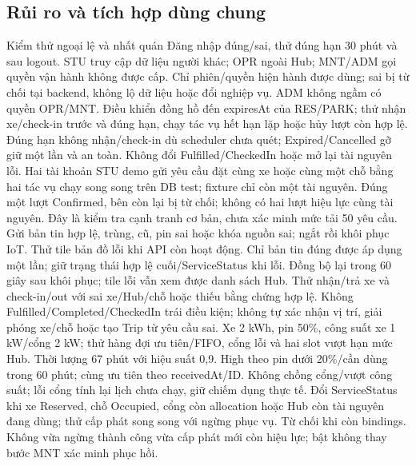 \subsection{Rủi ro và tích hợp dùng chung}
\begin{SystemTestCases}{Kiểm thử ngoại lệ và nhất quán}
{Đăng nhập đúng/sai, thử đúng hạn 30 phút và sau logout. STU truy cập dữ liệu người khác; OPR ngoài Hub; MNT/ADM gọi quyền vận hành không được cấp.}
{Chỉ phiên/quyền hiện hành được dùng; sai bị từ chối tại backend, không lộ dữ liệu hoặc đổi nghiệp vụ. ADM không ngầm có quyền OPR/MNT.}
{Điều khiển đồng hồ đến expiresAt của RES/PARK; thử nhận xe/check-in trước và đúng hạn, chạy tác vụ hết hạn lặp hoặc hủy lượt còn hợp lệ.}
{Đúng hạn không nhận/check-in dù scheduler chưa quét; Expired/Cancelled gỡ giữ một lần và an toàn. Không đổi Fulfilled/CheckedIn hoặc mở lại tài nguyên lỗi.}
{Hai tài khoản STU demo gửi yêu cầu đặt cùng xe hoặc cùng một chỗ bằng hai tác vụ chạy song song trên DB test; fixture chỉ còn một tài nguyên.}
{Đúng một lượt Confirmed, bên còn lại bị từ chối; không có hai lượt hiệu lực cùng tài nguyên. Đây là kiểm tra cạnh tranh cơ bản, chưa xác minh mức tải 50 yêu cầu.}
{Gửi bản tin hợp lệ, trùng, cũ, pin sai hoặc khóa nguồn sai; ngắt rồi khôi phục IoT. Thử tile bản đồ lỗi khi API còn hoạt động.}
{Chỉ bản tin đúng được áp dụng một lần; giữ trạng thái hợp lệ cuối/ServiceStatus khi lỗi. Đồng bộ lại trong 60 giây sau khôi phục; tile lỗi vẫn xem được danh sách Hub.}
{Thử nhận/trả xe và check-in/out với sai xe/Hub/chỗ hoặc thiếu bằng chứng hợp lệ.}
{Không Fulfilled/Completed/CheckedIn trái điều kiện; không tự xác nhận vị trí, giải phóng xe/chỗ hoặc tạo Trip từ yêu cầu sai.}
{Xe 2 kWh, pin 50\%, công suất xe 1 kW/cổng 2 kW; thử hàng đợi ưu tiên/FIFO, cổng lỗi và hai slot vượt hạn mức Hub.}
{Thời lượng 67 phút với hiệu suất 0,9. High theo pin dưới 20\%/cần dùng trong 60 phút; cùng ưu tiên theo receivedAt/ID. Không chồng cổng/vượt công suất; lỗi cổng tính lại lịch chưa chạy, giữ chiếm dụng thực tế.}
{Đổi ServiceStatus khi xe Reserved, chỗ Occupied, cổng còn allocation hoặc Hub còn tài nguyên đang dùng; thử cấp phát song song với ngừng phục vụ.}
{Từ chối khi còn bindings. Không vừa ngừng thành công vừa cấp phát mới còn hiệu lực; bật không thay bước MNT xác minh phục hồi.}

\end{SystemTestCases}
